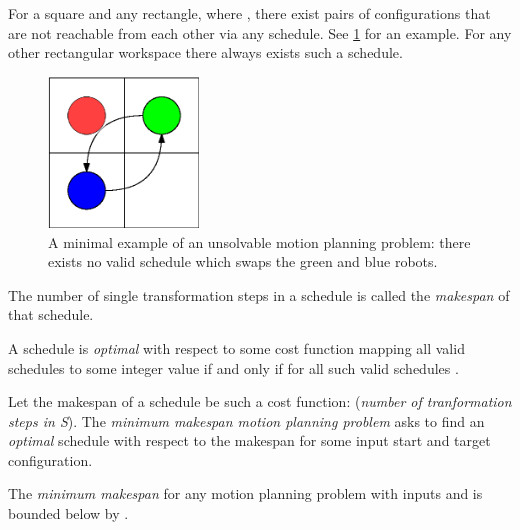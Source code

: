 \begin{remark}\label{remark:reachability}
	For a  square and any  rectangle, where , there exist pairs of configurations that are not reachable from each other via any schedule. See \cref{fig:reachability} for an example.
	For any other rectangular workspace there always exists such a schedule. 
\end{remark}
\begin{figure}[h]
	\centering
	\includegraphics[width=4cm]{include/impossible_2x2.eps}
	\caption{A minimal example of an unsolvable motion planning problem: there exists no valid schedule which swaps the green and blue robots.}\label{fig:reachability}
\end{figure}

\begin{definition}\label{def:makespan}
	The number of single transformation steps in a schedule is called the \emph{makespan} of that schedule.
\end{definition}

\begin{definition}\label{def:optimality}
	A schedule  is \emph{optimal} with respect to some cost function  mapping all valid schedules  to some integer value if and only if  for all such valid schedules .
\end{definition}

\begin{definition}\label{def:m3pp}
	Let the makespan of a schedule be such a cost function:  (\textit{number of tranformation steps in S}). The \emph{minimum makespan motion planning problem} asks to find an \emph{optimal} schedule with respect to the makespan  for some input start and target configuration.
\end{definition}

\begin{remark}
	The \emph{minimum makespan} for any motion planning problem with inputs  and  is bounded below by .
\end{remark}

